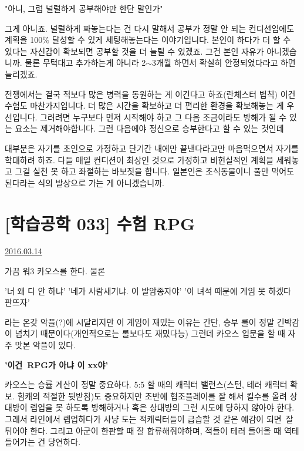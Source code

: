 "아니, 그럼 널럴하게 공부해야만 한단 말인가"
\vspace{5mm}

그게 아니죠. 널럴하게 짜놓는다는 건 다시 말해서 공부가 정말 안 되는 컨디션임에도 계획을 100$\%$ 달성할 수 있게 세팅해놓는다는 이야기입니다.
본인이 하다가 더 할 수 있다는 자신감이 확보되면 공부할 것을 더 늘릴 수 있겠죠. 그건 본인 자유가 아니겠습니까.
물론 무턱대고 추가하는게 아니라 2$\sim$3개월 하면서 확실히 안정되었다라고 하면 늘리겠죠.
\vspace{5mm}

전쟁에서는 결국 적보다 많은 병력을 동원하는 게 이긴다고 하죠(란체스터 법칙)
이건 수험도 마찬가지입니다. 더 많은 시간을 확보하고 더 편리한 환경을 확보해놓는 게 우선입니다.
그러려면 누구보다 먼저 시작해야 하고 그 다음 조금이라도 방해가 될 수 있는 요소는 제거해야합니다.
그런 다음에야 정신으로 승부한다고 할 수 있는 것인데
\vspace{5mm}

대부분은 자기를 초인으로 가정하고 단기간 내에만 끝낸다라고만 마음먹으면서 자기를 학대하려 하죠.
다들 매일 컨디션이 최상인 것으로 가정하고 비현실적인 계획을 세워놓고 그걸 실천 못 하고 좌절하는 바보짓을 합니다.
일본인은 초식동물이니 풀만 먹어도 된다라는 식의 발상으로 가는 게 아니겠습니까.
\vspace{5mm}







\section{[학습공학 033] 수험 RPG}
\href{https://www.kockoc.com/Apoc/675926}{2016.03.14}

\vspace{5mm}

가끔 워3 카오스를 한다. 물론
\vspace{5mm}

'너 왜 디 안 하냐'
'네가 사람새기냐. 이 발암종자야'
'이 녀석 때문에 게임 못 하겠다 판뜨자'
\vspace{5mm}

라는 온갖 악플(?)에 시달리지만 이 게임이 재밌는 이유는 간단,
승부 룰이 정말 긴박감이 넘치기 때문이다(개인적으로는 롤보다도 재밌다능)
그런데 카오스 입문을 할 때 자주 맛본 악플이 있다.
\vspace{5mm}

\textbf{'이건 RPG가 아냐 이 xx야'}
\vspace{5mm}

카오스는 승률 계산이 정말 중요하다.
5:5 할 때의 캐릭터 밸런스(스턴, 테러 캐릭터 확보. 힘캐의 적절한 뒷받침)도 중요하지만
초반에 협조플레이를 잘 해서 킬수를 올려 상대방이 렙업을 못 하도록 방해하거나
혹은 상대방의 그런 시도에 당하지 않아야 한다.
그래서 라인에서 렙업하다가 사냥 도는 적캐릭터들이 급습할 것 같은 예감이 되면 잘 튀어야 한다.
그리고 아군이 한판할 때 잘 합류해줘야하며, 적들이 테러 들어올 때 역테 들어가는 건 당연하다.
\vspace{5mm}

